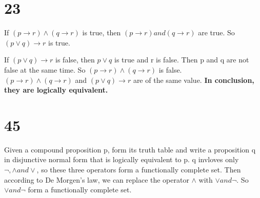 \documentclass[UTF8]{ctexart}
\begin{document}
\section{23}
If $(p \rightarrow r)\wedge (q\rightarrow r)$ is true, then $(p \rightarrow r) and (q\rightarrow r)$ are true. So $(p\vee q)\rightarrow r$ is true.

If $(p \vee q)\rightarrow r$ is false, then $p \vee q$ is true and r is false. Then p and q are not false at the same time. So $(p \rightarrow r)\wedge (q\rightarrow r)$ is false.\\
$(p \rightarrow r)\wedge (q\rightarrow r)$ and $(p \vee q)\rightarrow r$ are of the same value. \textbf{In conclusion, they are logically equivalent.}
\section{45}
Given a compound proposition p, form its truth table and write a proposition q in disjunctive normal form that is logically equivalent to p. q invloves only $\neg,\wedge and \vee$, so these three operators form a functionally complete set. 
Then according to De Morgen's law, we can replace the operator $\wedge$ with $\vee and \neg$. So $\vee and \neg$ form a functionally complete set. 
\end{document}
